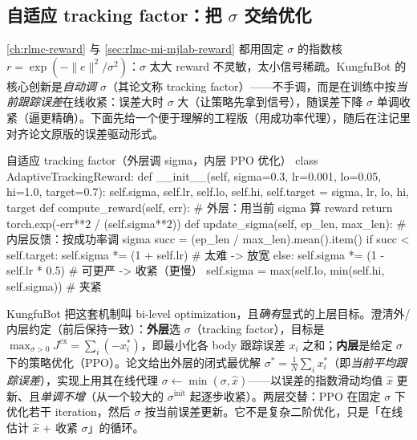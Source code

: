 \subsection{自适应 tracking factor：把 \texorpdfstring{$\sigma$}{sigma} 交给优化}
\label{sec:rlmc-mi-kungfu-blo}

\cref{ch:rlmc-reward} 与 \cref{sec:rlmc-mi-mjlab-reward} 都用固定 $\sigma$ 的指数核 $r=\exp(-\lVert e\rVert^2/\sigma^2)$：$\sigma$ 太大 reward 不灵敏，太小信号稀疏。KungfuBot 的核心创新是\emph{自动调 $\sigma$}（其论文称 tracking factor）——不手调，而是在训练中按\emph{当前跟踪误差}在线收紧：误差大时 $\sigma$ 大（让策略先拿到信号），随误差下降 $\sigma$ 单调收紧（逼更精确）。下面先给一个便于理解的工程版（用成功率代理），随后在注记里对齐论文原版的误差驱动形式。

\begin{codebox}[Python]{自适应 tracking factor（外层调 sigma，内层 PPO 优化）}
class AdaptiveTrackingReward:
    def __init__(self, sigma=0.3, lr=0.001, lo=0.05, hi=1.0, target=0.7):
        self.sigma, self.lr, self.lo, self.hi, self.target = sigma, lr, lo, hi, target
    def compute_reward(self, err):                      # 外层：用当前 sigma 算 reward
        return torch.exp(-err**2 / (self.sigma**2))
    def update_sigma(self, ep_len, max_len):            # 内层反馈：按成功率调 sigma
        succ = (ep_len / max_len).mean().item()
        if succ < self.target:  self.sigma *= (1 + self.lr)        # 太难 -> 放宽
        else:                   self.sigma *= (1 - self.lr * 0.5)  # 可更严 -> 收紧（更慢）
        self.sigma = max(self.lo, min(self.hi, self.sigma))        # 夹紧
\end{codebox}

\begin{note}
KungfuBot 把这套机制叫 bi-level optimization，且\emph{确有}显式的上层目标。澄清外/内层约定（前后保持一致）：\textbf{外层}选 $\sigma$（tracking factor），目标是 $\max_{\sigma>0} J^{\mathrm{ex}}=\sum_i(-x_i^\ast)$，即最小化各 body 跟踪误差 $x_i$ 之和；\textbf{内层}是给定 $\sigma$ 下的策略优化（PPO）。论文给出外层的闭式最优解 $\sigma^\ast=\tfrac1N\sum_i x_i^\ast$（即\emph{当前平均跟踪误差}），实现上用其在线代理 $\sigma\leftarrow\min(\sigma,\hat{x})$——以误差的指数滑动均值 $\hat{x}$ 更新、且\emph{单调不增}（从一个较大的 $\sigma^{\text{init}}$ 起逐步收紧）。两层交替：PPO 在固定 $\sigma$ 下优化若干 iteration，然后 $\sigma$ 按当前误差更新。它不是复杂二阶优化，只是「在线估计 $\hat x$ + 收紧 $\sigma$」的循环。
\end{note}

